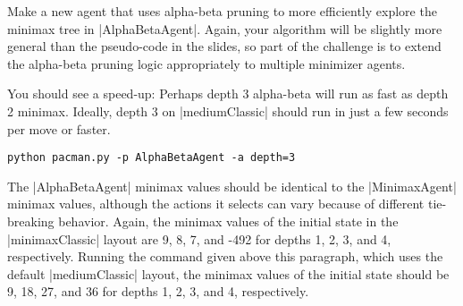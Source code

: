 \item {}
Make a new agent that uses alpha-beta pruning to more efficiently explore the
minimax tree in |AlphaBetaAgent|. Again, your algorithm will be slightly more
general than the pseudo-code in the slides, so part of the challenge is to
extend the alpha-beta pruning logic appropriately to multiple minimizer agents.

You should see a speed-up: Perhaps depth 3 alpha-beta will run as fast as depth
2 minimax. Ideally, depth 3 on |mediumClassic| should run in just a few seconds
per move or faster.

\begin{lstlisting}
python pacman.py -p AlphaBetaAgent -a depth=3
\end{lstlisting}

The |AlphaBetaAgent| minimax values should be identical to the |MinimaxAgent|
minimax values, although the actions it selects can vary because of different
tie-breaking behavior. Again, the minimax values of the initial state in the
|minimaxClassic| layout are 9, 8, 7, and -492 for depths 1, 2, 3, and 4,
respectively. Running the command given above this paragraph, which uses the
default |mediumClassic| layout, the minimax values of the initial state should
be 9, 18, 27, and 36 for depths 1, 2, 3, and 4, respectively.
